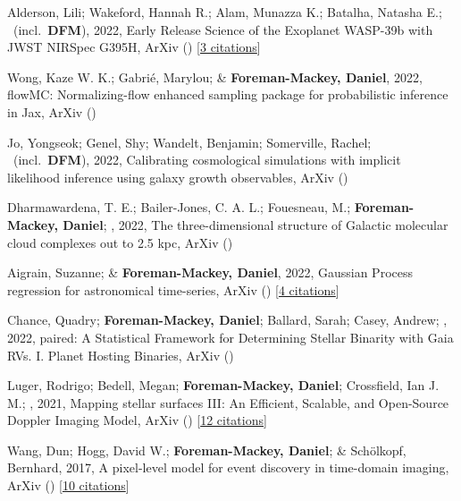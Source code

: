 \item[{\color{numcolor}\scriptsize11}] Alderson, Lili; Wakeford, Hannah R.; Alam, Munazza K.; Batalha, Natasha E.; \etal\ (incl.\ \textbf{DFM}), 2022, Early Release Science of the Exoplanet WASP-39b with JWST NIRSpec G395H, ArXiv () [\href{https://ui.adsabs.harvard.edu/abs/2022arXiv221110488A}{3 citations}]

\item[{\color{numcolor}\scriptsize10}] Wong, Kaze W. K.; Gabri{\'e}, Marylou; \& \textbf{Foreman-Mackey, Daniel}, 2022, flowMC: Normalizing-flow enhanced sampling package for probabilistic inference in Jax, ArXiv ()

\item[{\color{numcolor}\scriptsize9}] Jo, Yongseok; Genel, Shy; Wandelt, Benjamin; Somerville, Rachel; \etal\ (incl.\ \textbf{DFM}), 2022, Calibrating cosmological simulations with implicit likelihood inference using galaxy growth observables, ArXiv ()

\item[{\color{numcolor}\scriptsize8}] Dharmawardena, T. E.; Bailer-Jones, C. A. L.; Fouesneau, M.; \textbf{Foreman-Mackey, Daniel}; \etal, 2022, The three-dimensional structure of Galactic molecular cloud complexes out to 2.5 kpc, ArXiv ()

\item[{\color{numcolor}\scriptsize7}] Aigrain, Suzanne; \& \textbf{Foreman-Mackey, Daniel}, 2022, Gaussian Process regression for astronomical time-series, ArXiv () [\href{https://ui.adsabs.harvard.edu/abs/2022arXiv220908940A}{4 citations}]

\item[{\color{numcolor}\scriptsize6}] Chance, Quadry; \textbf{Foreman-Mackey, Daniel}; Ballard, Sarah; Casey, Andrew; \etal, 2022, paired: A Statistical Framework for Determining Stellar Binarity with Gaia RVs. I. Planet Hosting Binaries, ArXiv ()

\item[{\color{numcolor}\scriptsize5}] Luger, Rodrigo; Bedell, Megan; \textbf{Foreman-Mackey, Daniel}; Crossfield, Ian J. M.; \etal, 2021, Mapping stellar surfaces III: An Efficient, Scalable, and Open-Source Doppler Imaging Model, ArXiv () [\href{https://ui.adsabs.harvard.edu/abs/2021arXiv211006271L}{12 citations}]

\item[{\color{numcolor}\scriptsize4}] Wang, Dun; Hogg, David W.; \textbf{Foreman-Mackey, Daniel}; \& Sch{\"o}lkopf, Bernhard, 2017, A pixel-level model for event discovery in time-domain imaging, ArXiv () [\href{https://ui.adsabs.harvard.edu/abs/2017arXiv171002428W}{10 citations}]

